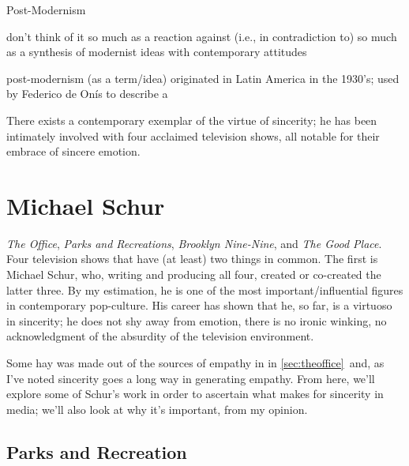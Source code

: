 \documentclass[../butidigress.tex]{subfiles}
\begin{document}
\begin{somenotes}{Post-Modernism}
    \item don't think of it so much as a reaction against (i.e., in contradiction to) so much as a synthesis of modernist ideas with contemporary attitudes
    \item post-modernism (as a term/idea) originated in Latin America in the 1930's; used by Federico de Onís to describe a 
\end{somenotes}

There exists a contemporary exemplar of the virtue of sincerity; he has been intimately involved with four acclaimed television shows, all notable for their embrace of sincere emotion.

\section{Michael Schur}
\textit{The Office}, \textit{Parks and Recreations}, \textit{Brooklyn Nine-Nine}, and \textit{The Good Place}.
Four television shows that have (at least) two things in common.
The first is Michael Schur, who, writing and producing all four, created or co-created the latter three.
By my estimation, he is one of the most important/influential figures in contemporary pop-culture.
His career has shown that he, so far, is a virtuoso in sincerity; he does not shy away from emotion, there is no ironic winking, no acknowledgment of the absurdity of the television environment.

Some hay was made out of the sources of empathy in  in \ref{sec:theoffice}\ and, as I've noted sincerity goes a long way in generating empathy.
From here, we'll explore some of Schur's work in order to ascertain what makes for sincerity in media; we'll also look at why it's important, from my opinion.

\subsection{Parks and Recreation}
\end{document}
